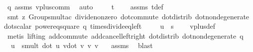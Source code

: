 \begin{isabellebody}
\ q\ assms\ vplus{\isacharunderscore}{\kern0pt}comm\ \isamarkupfalse%
\ auto\isanewline
\ \ \isamarkupfalse%
\ {}{\isacharcolon}{\kern0pt}\ {\isachardoublequoteopen}t\ {\isacharequal}{\kern0pt}\ {\isacharparenleft}{\kern0pt}{}{\isacharcomma}{\kern0pt}{}{\isacharcomma}{\kern0pt}{}{\isacharparenright}{\kern0pt}{\isachardoublequoteclose}\ \isamarkupfalse%
\ assms\ tdef\ \isanewline
\ \ \isamarkupfalse%
\ {\isacharparenleft}{\kern0pt}smt\ {\isacharparenleft}{\kern0pt}z{}{\isacharparenright}{\kern0pt}\ Groups{\isachardot}{\kern0pt}mult{\isacharunderscore}{\kern0pt}ac{\isacharparenleft}{\kern0pt}{}{\isacharparenright}{\kern0pt}\ divide{\isacharunderscore}{\kern0pt}non{\isacharunderscore}{\kern0pt}zero\ dot{\isacharunderscore}{\kern0pt}commute\ dot{\isacharunderscore}{\kern0pt}distrib\ dot{\isacharunderscore}{\kern0pt}non{\isacharunderscore}{\kern0pt}degenerate\ dot{\isacharunderscore}{\kern0pt}scalar\ power{}{\isacharunderscore}{\kern0pt}eq{\isacharunderscore}{\kern0pt}square\ q\ times{\isacharunderscore}{\kern0pt}divide{\isacharunderscore}{\kern0pt}eq{\isacharunderscore}{\kern0pt}left{\isacharparenright}{\kern0pt}\isanewline
\ \ \isamarkupfalse%
\ {}{\isacharcolon}{\kern0pt}\ {\isachardoublequoteopen}u\ {\isacharequal}{\kern0pt}\ s{\isachardoublequoteclose}\ \isamarkupfalse%
\ {}\ {}\ vplus{\isacharunderscore}{\kern0pt}def\ \isanewline
\ \ \isamarkupfalse%
\ {\isacharparenleft}{\kern0pt}metis\ {\isacharparenleft}{\kern0pt}lifting{\isacharparenright}{\kern0pt}\ add{\isachardot}{\kern0pt}commute\ add{\isacharunderscore}{\kern0pt}cancel{\isacharunderscore}{\kern0pt}left{\isacharunderscore}{\kern0pt}right\ dot{\isacharunderscore}{\kern0pt}distrib\ dot{\isacharunderscore}{\kern0pt}non{\isacharunderscore}{\kern0pt}degenerate\ q{\isacharparenright}{\kern0pt}\isanewline
\ \ \isamarkupfalse%
\ {}{\isacharcolon}{\kern0pt}\ {\isachardoublequoteopen}u\ {\isacharequal}{\kern0pt}\ smult\ {\isacharparenleft}{\kern0pt}{\isacharparenleft}{\kern0pt}dot\ u\ v{\isacharparenright}{\kern0pt}{\isacharslash}{\kern0pt}{\isacharparenleft}{\kern0pt}dot\ v\ v{\isacharparenright}{\kern0pt}{\isacharparenright}{\kern0pt}\ v{\isachardoublequoteclose}\ \isamarkupfalse%
\ {}\ assms\ \isamarkupfalse%
\ blast\isanewline
\ \ \isamarkupfalse%

\end{isabellebody}
